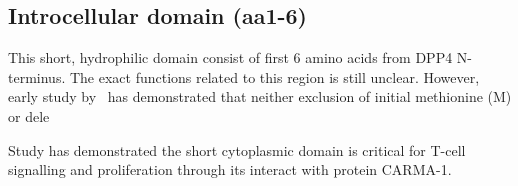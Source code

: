 \subsection{Introcellular domain (aa1-6)}

This short, hydrophilic domain consist of first 6 amino acids from DPP4 N-terminus. The exact functions related to this region is still unclear. However, early study by~\citet{Hong1990} has demonstrated that neither exclusion of initial methionine (M) or dele

Study has demonstrated the short cytoplasmic domain is critical for T-cell signalling and proliferation through its interact with protein CARMA-1. \cite{Ohnuma_2007}